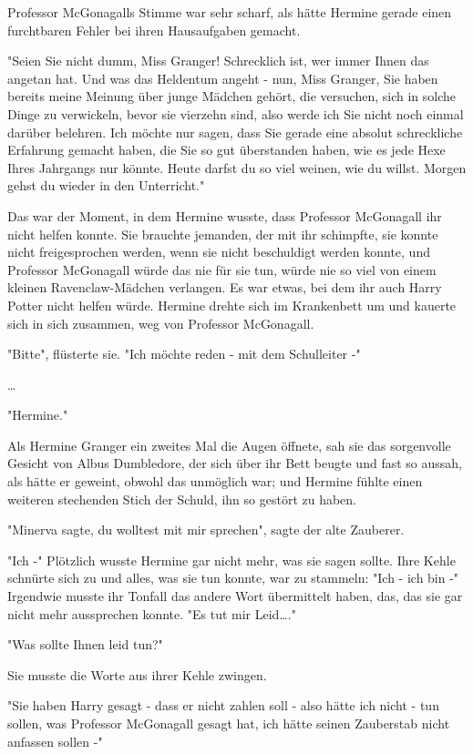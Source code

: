 {Professor McGonagalls Stimme war sehr scharf, als hätte Hermine gerade einen furchtbaren Fehler bei ihren Hausaufgaben gemacht.

"Seien Sie nicht dumm, Miss Granger! Schrecklich ist, wer immer Ihnen das angetan hat. Und was das Heldentum angeht - nun, Miss Granger, Sie haben bereits meine Meinung über junge Mädchen gehört, die versuchen, sich in solche Dinge zu verwickeln, bevor sie vierzehn sind, also werde ich Sie nicht noch einmal darüber belehren. Ich möchte nur sagen, dass Sie gerade eine absolut schreckliche Erfahrung gemacht haben, die Sie so gut überstanden haben, wie es jede Hexe Ihres Jahrgangs nur könnte. Heute darfst du so viel weinen, wie du willst. Morgen gehst du wieder in den Unterricht."

Das war der Moment, in dem Hermine wusste, dass Professor McGonagall ihr nicht helfen konnte. Sie brauchte jemanden, der mit ihr schimpfte, sie konnte nicht freigesprochen werden, wenn sie nicht beschuldigt werden konnte, und Professor McGonagall würde das nie für sie tun, würde nie so viel von einem kleinen Ravenclaw-Mädchen verlangen. Es war etwas, bei dem ihr auch Harry Potter nicht helfen würde. Hermine drehte sich im Krankenbett um und kauerte sich in sich zusammen, weg von Professor McGonagall.

"Bitte", flüsterte sie. "Ich möchte reden - mit dem Schulleiter -"

…

"Hermine."

Als Hermine Granger ein zweites Mal die Augen öffnete, sah sie das sorgenvolle Gesicht von Albus Dumbledore, der sich über ihr Bett beugte und fast so aussah, als hätte er geweint, obwohl das unmöglich war; und Hermine fühlte einen weiteren stechenden Stich der Schuld, ihn so gestört zu haben.

"Minerva sagte, du wolltest mit mir sprechen", sagte der alte Zauberer.

"Ich -" Plötzlich wusste Hermine gar nicht mehr, was sie sagen sollte. Ihre Kehle schnürte sich zu und alles, was sie tun konnte, war zu stammeln: "Ich - ich bin -" Irgendwie musste ihr Tonfall das andere Wort übermittelt haben, das, das sie gar nicht mehr aussprechen konnte. "Es tut mir Leid…."

"Was sollte Ihnen leid tun?"

Sie musste die Worte aus ihrer Kehle zwingen.

"Sie haben Harry gesagt - dass er nicht zahlen soll - also hätte ich nicht - tun sollen, was Professor McGonagall gesagt hat, ich hätte seinen Zauberstab nicht anfassen sollen -"

}
